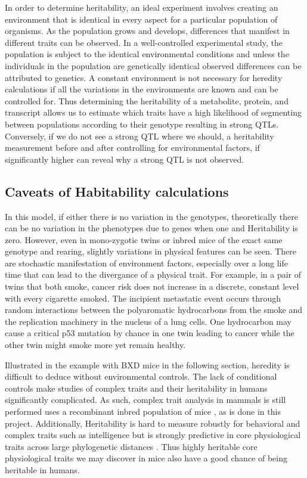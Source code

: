 \documentclass[a4paper,11pt,twoside]{book}
\begin{document}
    In order to determine heritability, an ideal experiment involves creating an environment that is identical in every aspect for a particular population of organisms. As the population grows and develops, differences that manifest in different traits can be observed. In a well-controlled experimental study, the population is subject to the identical environmental conditions and unless the individuals in the population are genetically identical observed differences can be attributed to genetics. A constant environment is not necessary for heredity calculations if all the variations in the environments are known and can be controlled for. Thus determining the heritability of a metabolite, protein, and transcript allows us to estimate which traits have a high likelihood of segmenting between populations according to their genotype resulting in strong QTLs. Conversely, if we do not see a strong QTL where we should, a heritability measurement before and after controlling for environmental factors, if significantly higher can reveal why a strong QTL is not observed.
	
\subsection*{Caveats of Habitability calculations}
	
	In this model, if either there is no variation in the genotypes, theoretically there can be no variation in the phenotypes due to genes when one and Heritability is zero. However, even in mono-zygotic twins or inbred mice of the exact same genotype and rearing, slightly variations in physical features can be seen. There are stochastic manifestation of environment factors, especially over a long life time that can lead to the divergance of a physical trait\citep{Czyz2012Geneticdifferences}. For example, in a pair of twins that both smoke, cancer risk does not increase in a discrete, constant level with every cigarette smoked. The incipient metastatic event occurs through random interactions between the polyaromatic hydrocarbons from the smoke and the replication machinery in the nucleus of a lung cells. One hydrocarbon may cause a critical p53 mutation by chance in one twin leading to cancer while the other twin might smoke more yet remain healthy.
	
    Illustrated in the example with BXD mice in the following section, heredity is difficult to deduce without environmental controls. The lack of conditional controls make studies of complex traits and their heritability in humans significantly complicated. As such, complex trait analysis in mammals is still performed uses a recombinant inbred population of mice \citep{Williams2015TheAnalysis}, as is done in this project. Additionally, Heritability is hard to measure robustly for behavioral and complex traits such as intelligence but is strongly predictive in core physiological traits across large phylogenetic distances \citep{Falconer1996IntroductionGenetics}. Thus highly heritable core physiological traits we may discover in mice also have a good chance of being heritable in humans.
	
\end{document}
